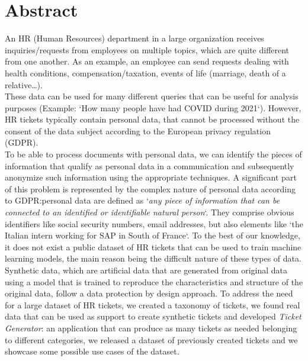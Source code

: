 \chapter*{Abstract}

An HR (Human Resources) department in a large organization receives inquiries\slash requests from employees on multiple topics, which are quite different from one another. As an example, an employee can send requests dealing with health conditions, compensation/taxation, events of life (marriage, death of a relative\dots). \\
These data can be used for many different queries that can be useful for analysis purposes (Example: `How many people have had COVID during 2021`). However, HR tickets typically contain personal data, that cannot be processed without the consent of the data subject according to the European privacy regulation (GDPR). \\
To be able to process documents with personal data, we can identify the pieces of information that qualify as personal data in a communication and subsequently anonymize such information using the appropriate techniques.
A significant part of this problem is represented by the complex nature of personal data according to GDPR:\@ personal data are defined as `\textit{any piece of information that can be connected to an identified or identifiable natural person}`. They comprise obvious identifiers like social security numbers, email addresses, but also elements like `the Italian intern working for SAP in South of France`.
To the best of our knowledge, it does not exist a public dataset of HR tickets that can be used to train machine learning models, the main reason being the difficult nature of these types of data. Synthetic data, which are artificial data that are generated from original data using a model that is trained to reproduce the characteristics and structure of the original data, follow a data protection by design approach.
To address the need for a large dataset of HR tickets, we created a taxonomy of tickets, we found real data that can be used as support to create synthetic tickets and developed \textit{Ticket Generator}: an application that can produce as many tickets as needed belonging to different categories, we released a dataset of previously created tickets and we showcase some possible use cases of the dataset.
